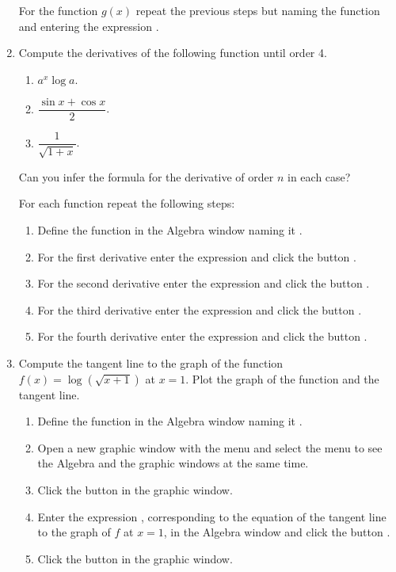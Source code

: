 \begin{enumerate}[leftmargin=*]
\begin{indication}
For the function $g(x)$ repeat the previous steps but naming the function  and entering the expression .
\end{indication}


\item Compute the derivatives of the following function until order 4.
\begin{enumerate}
\item $a^x\log a$.
\item $\dfrac{\sin x +\cos x}{2}$.
\item $\dfrac{1}{\sqrt{1+x}}$.
\end{enumerate}

Can you infer the formula for the derivative of order $n$ in each case?

\begin{indication}
For each function repeat the following steps:
\begin{enumerate}
\item Define the function in the Algebra window naming it .
\item For the first derivative enter the expression  and click the button .
\item For the second derivative enter the expression  and click the button .
\item For the third derivative enter the expression  and click the button .
\item For the fourth derivative enter the expression  and click the button .
\end{enumerate}
\end{indication}


\item Compute the tangent line to the graph of the function $f(x)=\log(\sqrt{x+1})$ at $x=1$.
Plot the graph of the function and the tangent line.
\begin{indication}
\begin{enumerate}
\item Define the function in the Algebra window naming it .
\item Open a new graphic window with the menu  and select the menu  to see the Algebra and the graphic windows at the same time.
\item Click the button  in the graphic window.
\item Enter the expression , corresponding to the equation of the tangent line to the graph of $f$ at $x=1$, in the Algebra window and click the button .
\item Click the button  in the graphic window.
\end{enumerate}
\end{indication}


\end{enumerate}
